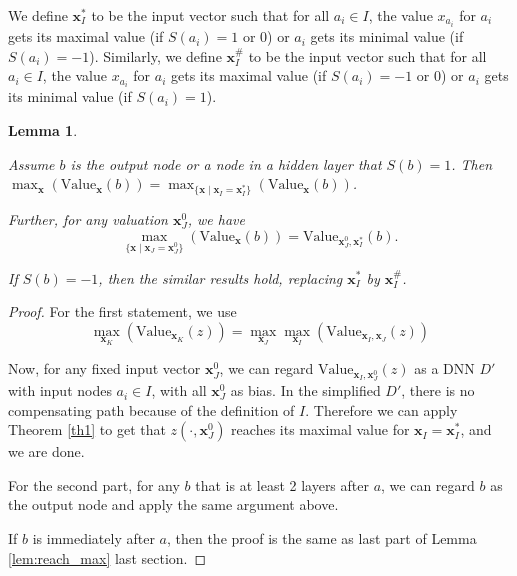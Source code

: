 \documentclass[]{article}
\newtheorem{lemma}{Lemma}
\theoremstyle{definition}
\newcommand{\Val}{\mathrm{Value}}
\begin{document}
We define $\boldsymbol{x}_I^*$ to be the input vector such that for all $a_i \in I$, the value $x_{a_i}$ for $a_i$ gets its maximal value (if $S(a_i)=1$ or $0$) or $a_i$ gets its minimal value (if $S(a_i)=-1$). Similarly, we define $\boldsymbol{x}_I^\#$ to be the input vector such that for all $a_i \in I$, the value $x_{a_i}$ for $a_i$ gets its maximal value (if $S(a_i)=-1$ or $0$) or $a_i$ gets its minimal value (if $S(a_i)=1$).



\begin{lemma} \label{lem:reach_max_2}
	
	Assume $b$ is the output node or a node in a hidden layer that $S(b)=1$. Then
	$\max_{\boldsymbol{x}} (\Val_{\boldsymbol{x}}(b)) =\max_{\{\boldsymbol{x} \mid \boldsymbol{x}_I=\boldsymbol{x}^*_I\}} (\Val_{\boldsymbol{x}}(b))$.
	
	Further,  for any valuation $\boldsymbol{x}^0_J$, 
	we have $$\max_{\{\boldsymbol{x} \mid \boldsymbol{x}_J=\boldsymbol{x}^0_J\}} (\Val_{\boldsymbol{x}}(b)) =  \Val_{\boldsymbol{x}^0_J,\boldsymbol{x}_I^*}(b).$$
	
	If $S(b)=-1$, then the similar results hold, replacing $\boldsymbol{x}^*_I$ by $\boldsymbol{x}^\#_I$. 
\end{lemma}

\begin{proof}
	For the first statement, we use 
	$$\max_{\boldsymbol{x}_K} (\Val_{\boldsymbol{x}_K}(z)) =\max_{\boldsymbol{x}_J} \max_{\boldsymbol{x}_I} (\Val_{\boldsymbol{x}_I,\boldsymbol{x}_J}(z))$$
	
	Now, for any fixed input vector $\boldsymbol{x}^0_J$, we can regard $\Val_{\boldsymbol{x}_I,\boldsymbol{x}^0_J}(z)$ as a DNN $D'$ with input nodes $a_i\in I$, with all $\boldsymbol{x}^0_J$ %
	as bias. In the simplified $D'$, there is no compensating path because of the definition of $I$. Therefore we can apply Theorem \ref{th1} to get that $z(\cdot,\boldsymbol{x}^0_J)$ reaches its maximal value for $\boldsymbol{x}_I=\boldsymbol{x}_I^*$, and we are done.
	
	For the second part, for any $b$ that is at least 2 layers after $a$, we can regard $b$ as the output node and apply the same argument above.
	
	If $b$ is immediately after $a$, then the proof is the same as last part of Lemma \ref{lem:reach_max} last section.
	

\end{proof}
\end{document}
